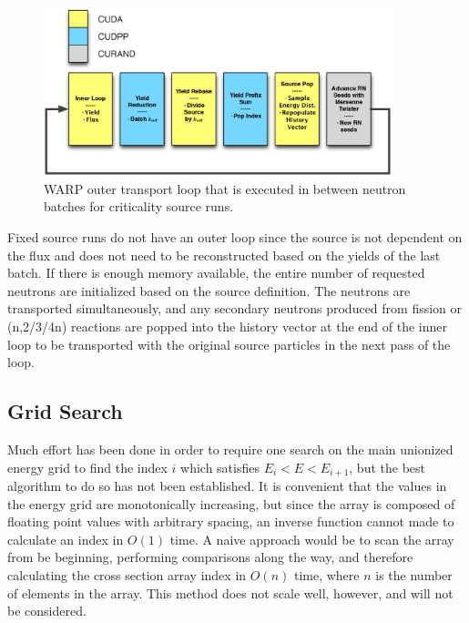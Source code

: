 \begin{figure}[h!] 
\centering
\includegraphics[width=0.9\textwidth]{graphics/warp_outer_loop.eps}
\caption{WARP outer transport loop that is executed in between neutron batches for criticality source runs. \label{warp_outer_loop} }
\end{figure}

Fixed source runs do not have an outer loop since the source is not dependent on the flux and does not need to be reconstructed based on the yields of the last batch.  If there is enough memory available, the entire number of requested neutrons are initialized based on the source definition.  The neutrons are transported simultaneously, and any secondary neutrons produced from fission or (n,2/3/4n) reactions are popped into the history vector at the end of the inner loop to be transported with the original source particles in the next pass of the loop.

\subsection{Grid Search}

Much effort has been done in order to require one search on the main unionized energy grid to find the index $i$ which satisfies $E_i<E<E_{i+1}$, but the best algorithm to do so has not been established.  It is convenient that the values in the energy grid are monotonically increasing, but since the array is composed of floating point values with arbitrary spacing, an inverse function cannot made to calculate an index in $O(1)$ time.   A naive approach would be to scan the array from be beginning, performing comparisons along the way, and therefore calculating the cross section array index in $O(n)$ time, where $n$ is the number of elements in the array.  This method does not scale well, however, and will not be considered.  

